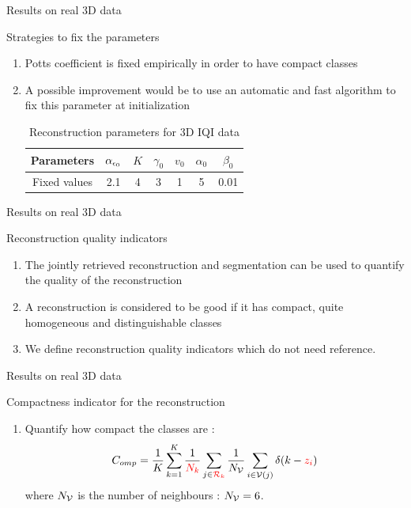 \documentclass[latex]{beamer}
\def\beq{\[} \def\eeq{\]}
\begin{document}
\begin{frame}{Results on real 3D data}
\begin{block}{Strategies to fix the parameters}
\begin{enumerate}
\item Potts coefficient is fixed empirically in order to have compact classes
\item A possible improvement would be to use an automatic and fast algorithm to fix this parameter at initialization
\begin{table}[htb]
\begin{center}
\begin{tabular}{|*{7}{c|}}
\hline
\textbf{Parameters} & $\alpha_{\epsilon_0}$ & $K$ & $\gamma_{0}$ & $v_0$ & $\alpha_0$ & $\beta_0$ \\
\hline
Fixed values & 2.1 & 4 & 3 & 1 & 5 & 0.01 \\
\hline
\end{tabular}
\end{center}
\caption{Reconstruction parameters for 3D IQI data}
\label{tab:Reconstruction parameters}
\end{table}
\end{enumerate}
\end{block}
\end{frame}

\begin{frame}{Results on real 3D data}
\begin{block}{Reconstruction quality indicators}
\begin{enumerate}
\item The jointly retrieved reconstruction and segmentation can be used to quantify the quality of the reconstruction
\item A reconstruction is considered to be good if it has compact, quite homogeneous and distinguishable classes
\item We define reconstruction quality indicators which do not need reference.
\end{enumerate}
\end{block}
\end{frame}

\begin{frame}{Results on real 3D data}
\begin{block}{Compactness indicator for the reconstruction}
\begin{enumerate}
\item Quantify how compact the classes are :
\beq
C_{omp}=\frac{1}{K}\sum_{k=1}^{K}\frac{1}{\red{N_k}}\sum_{j \in \red{\Rc_k}}\frac{1}{N_{\Vc}}\sum_{i \in \Vc(j)} \delta(k-\red{z_i})
\label{eq:compacity at voxel's scale}
\eeq
where $N_{{\mathcal{V}}}$ is the number of neighbours : $N_{{\mathcal{V}}}=6$.
\end{enumerate}
\end{block}
\end{frame}
\end{document}
